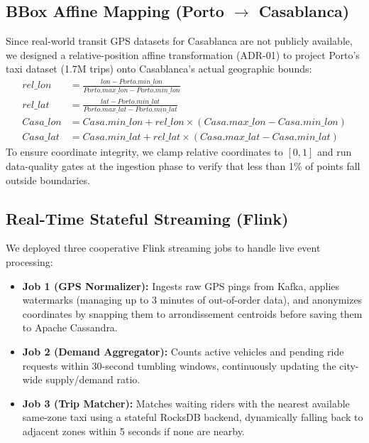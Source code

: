 \documentclass[11pt,a4paper]{article}
\begin{document}
\subsection{BBox Affine Mapping (Porto $\rightarrow$ Casablanca)}
Since real-world transit GPS datasets for Casablanca are not publicly available, we designed a relative-position affine transformation (ADR-01) to project Porto's taxi dataset (1.7M trips) onto Casablanca's actual geographic bounds:
\begin{align*}
rel\_lon &= \frac{lon - Porto.min\_lon}{Porto.max\_lon - Porto.min\_lon} \\
rel\_lat &= \frac{lat - Porto.min\_lat}{Porto.max\_lat - Porto.min\_lat} \\
Casa\_lon &= Casa.min\_lon + rel\_lon \times (Casa.max\_lon - Casa.min\_lon) \\
Casa\_lat &= Casa.min\_lat + rel\_lat \times (Casa.max\_lat - Casa.min\_lat)
\end{align*}
To ensure coordinate integrity, we clamp relative coordinates to $[0,1]$ and run data-quality gates at the ingestion phase to verify that less than 1\% of points fall outside boundaries.

\subsection{Real-Time Stateful Streaming (Flink)}
We deployed three cooperative Flink streaming jobs to handle live event processing:
\begin{itemize}
    \item \textbf{Job 1 (GPS Normalizer):} Ingests raw GPS pings from Kafka, applies watermarks (managing up to 3 minutes of out-of-order data), and anonymizes coordinates by snapping them to arrondissement centroids before saving them to Apache Cassandra.
    \item \textbf{Job 2 (Demand Aggregator):} Counts active vehicles and pending ride requests within 30-second tumbling windows, continuously updating the city-wide supply/demand ratio.
    \item \textbf{Job 3 (Trip Matcher):} Matches waiting riders with the nearest available same-zone taxi using a stateful RocksDB backend, dynamically falling back to adjacent zones within 5 seconds if none are nearby.
\end{itemize}
\end{document}
